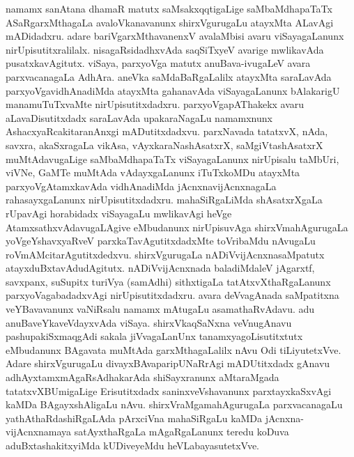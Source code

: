 namamx sanAtana dhamaR matutx saMsakxqqtigaLige saMbaMdhapaTaTx ASaRgarxMthagaLa avaloVkanavanunx shirxVgurugaLu atayxMta ALavAgi mADidadxru. adare bariVgarxMthavanenxV avalaMbisi avaru viSayagaLanunx nirUpisutitxralilalx. nisagaRsidadhxvAda saqSiTxyeV avarige mwlikavAda pusatxkavAgitutx. viSaya, parxyoVga matutx anuBava-ivugaLeV avara parxvacanagaLa AdhAra. aneVka saMdaBaRgaLalilx atayxMta saraLavAda parxyoVgavidhAnadiMda atayxMta gahanavAda viSayagaLanunx bAlakarigU manamuTuTxvaMte nirUpisutitxdadxru. parxyoVgapAThakekx  avaru aLavaDisutitxdadx saraLavAda upakaraNagaLu namamxnunx AshacxyaRcakitaranAnxgi mADutitxdadxvu. parxNavada tatatxvX, nAda, savxra, akaSxragaLa vikAsa, vAyxkaraNashAsatxrX, saMgiVtashAsatxrX muMtAdavugaLige saMbaMdhapaTaTx viSayagaLanunx nirUpisalu taMbUri, viVNe, GaMTe muMtAda vAdayxgaLanunx iTuTxkoMDu atayxMta parxyoVgAtamxkavAda vidhAnadiMda jAcnxnavijAcnxnagaLa rahasayxgaLanunx  nirUpisutitxdadxru. mahaSiRgaLiMda shAsatxrXgaLa rUpavAgi horabidadx viSayagaLu mwlikavAgi heVge AtamxsathxvAdavugaLAgive eMbudanunx nirUpisuvAga shirxVmahAgurugaLa yoVgeYshavxyaRveV parxkaTavAgutitxdadxMte toVribaMdu nAvugaLu roVmAMcitarAgutitxdedxvu. shirxVgurugaLa nADiVvijAcnxnasaMpatutx atayxduBxtavAdudAgitutx. nADiVvijAcnxnada baladiMdaleV jAgarxtf, savxpanx, suSupitx turiVya (samAdhi) sithxtigaLa tatAtxvXthaRgaLanunx parxyoVagabadadxvAgi nirUpisutitxdadxru. avara deVvagAnada saMpatitxna veYBavavanunx vaNiRsalu namamx mAtugaLu asamathaRvAdavu. adu anuBaveYkaveVdayxvAda viSaya. shirxVkaqSaNxna veVnugAnavu pashupakiSxmaqgAdi sakala jiVvagaLanUnx tanamxyagoLisutitxtutx eMbudanunx  BAgavata muMtAda garxMthagaLalilx nAvu Odi tiLiyutetxVve. Adare shirxVgurugaLu divayxBAvaparipUNaRrAgi mADUtitxdadx gAnavu adhAyxtamxmAgaRsAdhakarAda shiSayxranunx aMtaraMgada tatatxvXBUmigaLige Erisutitxdadx saninxveVshavanunx parxtayxkaSxvAgi kaMDa BAgayxshAligaLu nAvu. shirxVraMgamahAgurugaLa parxvacanagaLu yathAthaRdashiRgaLAda pArxciVna mahaSiRgaLu kaMDa jAcnxna-vijAcnxnamaya satAyxthaRgaLa mAgaRgaLanunx teredu koDuva aduBxtashakitxyiMda kUDiveyeMdu heVLabayasutetxVve. 

